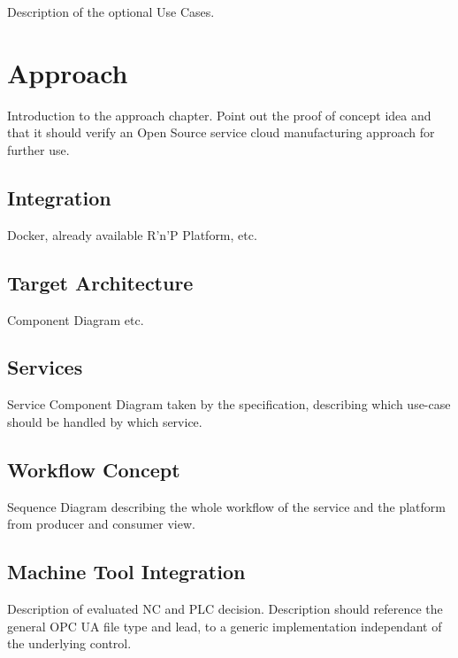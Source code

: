 \documentclass[
a4paper,
twoside,
headsepline,
cleardoublepage=empty,
parskip=half,
draft=false
]{scrbook}
\begin{document}
				Description of the optional Use Cases.
				
		\section{Approach} \label{sec:approach}
		
			Introduction to the approach chapter. Point out the proof of concept idea and that it should verify an Open Source service cloud manufacturing approach for further use.
		
			\subsection{Integration} \label{subsec:integration}
			
				Docker, already available R'n'P Platform, etc.
				
			\subsection{Target Architecture} \label{subsec:target_architecture}
			
				Component Diagram etc.
			
			\subsection{Services} \label{subsec:services}
			
				Service Component Diagram taken by the specification, describing which use-case should be handled by which service.
				
			\subsection{Workflow Concept} \label{subsec:workflow_concept}
			
				Sequence Diagram describing the whole workflow of the service and the platform from producer and consumer view.
				
			\subsection{Machine Tool Integration} \label{subsec:machine_tool_intergation}
			
				Description of evaluated NC and PLC decision. Description should reference the general OPC UA file type and lead, to a generic implementation independant of the underlying control.
				
\end{document}
